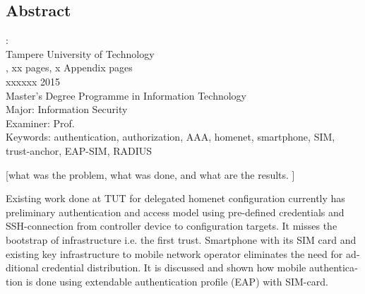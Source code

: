 \documentclass[12pt,a4paper,english]{tutthesis}
\begin{document}
\if@twoside
\clearpage
\fi


\setcounter{page}{0} %

\begin{otherlanguage}{english} %
\chapter*{Abstract}

\begin{spacing}{1.0}
  {\bf \textsf{\MakeUppercase{\@author}}}: \@title\\   %
   \textsf{Tampere University of Technology}\\
   \textsf{\@thesistype, xx pages, x Appendix pages} \\
   \textsf{xxxxxx 2015}\\
   \textsf{Master's Degree Programme in Information Technology}\\
   \textsf{Major: Information Security}\\
   \textsf{Examiner: Prof. \@examiner}\\ %
   \textsf{Keywords: authentication, authorization, AAA, homenet, smartphone, SIM, trust-anchor, EAP-SIM, RADIUS}\\
\end{spacing}

[what was the problem, what was done, and what are the results. ]

Existing work done at TUT for delegated homenet configuration
currently has preliminary authentication and access model using
pre-defined credentials and SSH-connection from 
controller device to configuration targets. It misses the bootstrap of 
infrastructure i.e. the first trust. 
Smartphone with its SIM card and existing key infrastructure to mobile network operator eliminates the need for additional credential distribution.
It is discussed and shown how mobile authentication is done
using extendable authentication profile (EAP) with SIM-card. 



\end{otherlanguage}
\end{document}
